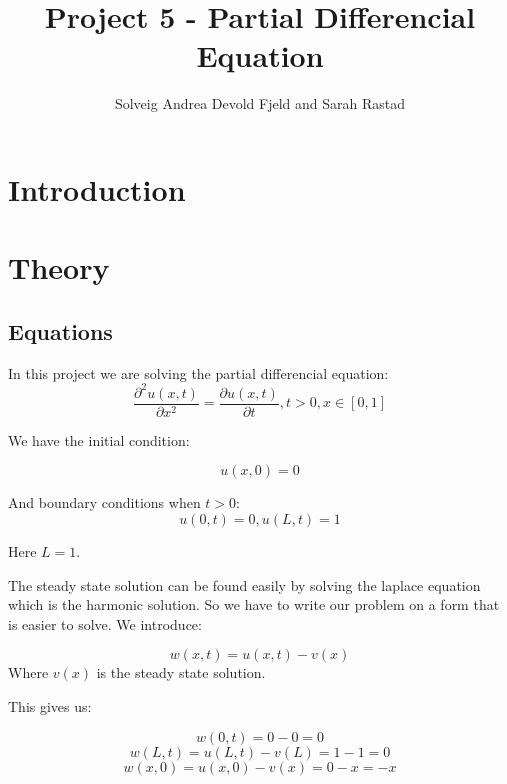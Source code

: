 \documentclass[a4paper,10pt]{article}
\title{Project 5 - Partial Differencial Equation}
\author{Solveig Andrea Devold Fjeld and Sarah Rastad}
\begin{document}
\maketitle

\begin{abstract}

\end{abstract}

\section{Introduction}


\section{Theory}
\subsection{Equations}
In this project we are solving the partial differencial equation:
\begin{equation}
  \frac{\partial^2 u(x,t)}{\partial x^2} =\frac{\partial u(x,t)}{\partial t}, t> 0, x\in [0,1]
  \label{eq:PartDiff}
\end{equation}

We have the initial condition:

\begin{equation}
 u(x,0) = 0
\end{equation}

And boundary conditions when $t>0$:
\begin{equation}
 u(0,t) = 0,
 u(L,t) = 1
\end{equation}

Here $L=1$.

The steady state solution can be found easily by solving the laplace equation which is the harmonic solution. So we have to write our problem on 
a form that is easier to solve. We introduce:

\begin{equation}
 w(x,t) = u(x,t) - v(x)
 \label{WritingEasier}
\end{equation}
Where $v(x)$ is the steady state solution.

This gives us:

\begin{equation}
 w(0,t) = 0 - 0 = 0
\end{equation}
\begin{equation}
w(L,t) = u(L,t) - v(L) = 1 -1 = 0  
\end{equation}
\begin{equation}
 w(x,0) = u(x,0) - v(x) = 0 -x = -x
\end{equation}
\end{document}
